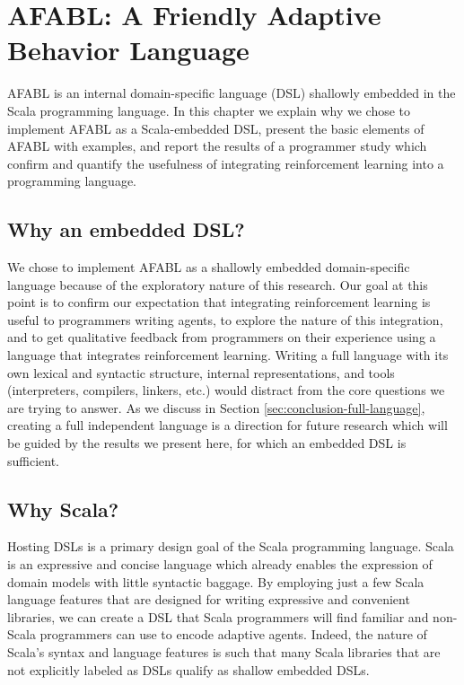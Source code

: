 \chapter{AFABL: A Friendly Adaptive Behavior Language}\label{ch:afabl}

AFABL is an internal domain-specific language (DSL) shallowly embedded in the Scala programming language. In this chapter we explain why we chose to implement AFABL as a Scala-embedded DSL, present the basic elements of AFABL with examples, and report the results of a programmer study which confirm and quantify the usefulness of integrating reinforcement learning into a programming language.

\section{Why an embedded DSL?}

We chose to implement AFABL as a shallowly embedded domain-specific language because of the exploratory nature of this research. Our goal at this point is to confirm our expectation that integrating reinforcement learning is useful to programmers writing agents, to explore the nature of this integration, and to get qualitative feedback from programmers on their experience using a language that integrates reinforcement learning. Writing a full language with its own lexical and syntactic structure, internal representations, and tools (interpreters, compilers, linkers, etc.) would distract from the core questions we are trying to answer. As we discuss in Section \ref{sec:conclusion-full-language}, creating a full independent language is a direction for future research which will be guided by the results we present here, for which an embedded DSL is sufficient.

\section{Why Scala?}

Hosting DSLs is a primary design goal of the Scala programming language. Scala is an expressive and concise language which already enables the expression of domain models with little syntactic baggage. By employing just a few Scala language features that are designed for writing expressive and convenient libraries, we can create a DSL that Scala programmers will find familiar and non-Scala programmers can use to encode adaptive agents. Indeed, the nature of Scala's syntax and language features is such that many Scala libraries that are not explicitly labeled as DSLs qualify as shallow embedded DSLs. 

